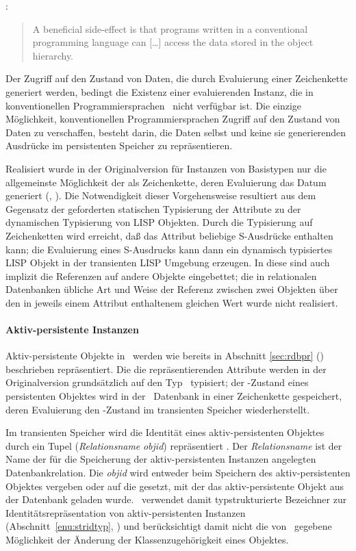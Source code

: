 \cite[]{bib:ro87}:
%
\begin{quote}
A beneficial side-effect is that programs written in a conventional
programming language can [\ldots] access the data stored in the
object hierarchy.
\end{quote}
%
Der Zugriff auf den Zustand von Daten, die durch Evaluierung einer
Zeichenkette generiert werden, bedingt die Existenz einer
evaluierenden Instanz, die in konventionellen Programmiersprachen
\ia\ nicht verf\"{u}gbar ist. Die einzige M\"{o}glichkeit,
konventionellen Programmiersprachen Zugriff auf den Zustand von Daten
zu verschaffen, besteht darin, die Daten selbst und keine sie
generierenden Ausdr\"{u}cke im persistenten Speicher zu repr\"{a}sentieren.
%
\par{}Realisiert wurde in der Originalversion f\"{u}r Instanzen von
Basistypen nur die allgemeinste M\"{o}glichkeit der \representation{} als
Zeichenkette, deren Evaluierung das Datum generiert (\handle,
\citepage{\pageref{sec:handle}}). Die Notwendigkeit dieser
Vorgehensweise resultiert aus dem Gegensatz der geforderten statischen
Typisierung der Attribute zu der dynamischen Typisierung von LISP
Objekten. Durch die Typisierung auf Zeichenketten wird erreicht,
da\ss{} das Attribut beliebige S-Ausdr\"{u}cke enthalten kann; die
Evaluierung eines S-Ausdrucks kann dann ein dynamisch typisiertes LISP
Objekt in der transienten LISP Umgebung erzeugen. In diese
\representationform{} sind auch implizit die Referenzen auf andere
Objekte eingebettet; die in relationalen Datenbanken \"{u}bliche Art und
Weise der Referenz zwischen zwei Objekten \"{u}ber den in jeweils einem
Attribut enthaltenem gleichen Wert wurde nicht realisiert.
%
\paragraph{Aktiv-persistente Instanzen}%
\label{sec:sohapi}%
%
Aktiv-persistente Objekte in \soh\ werden wie
bereits in Abschnitt \ref{sec:rdbpr} (\citepage{\pageref{sec:rdbpr}})
beschrieben repr\"{a}sentiert. Die die \Slt[s]\/ repr\"{a}sentierenden
Attribute werden in der Originalversion grunds\"{a}tzlich auf den Typ
\ typisiert; der
\Slt\/-Zustand eines persistenten Objektes wird in der
\postgres\ Datenbank in einer Zeichenkette gespeichert, deren
Evaluierung den \Slt\/-Zustand im transienten Speicher
wiederherstellt.
%
\par{}Im transienten Speicher wird die Identit\"{a}t eines
aktiv-persistenten Objektes durch ein Tupel
({\it\lt{}Relationsname\gt\/} {\it\lt{}objid\gt\/}) repr\"{a}sentiert
\cite[]{bib:ro87}. Der
{\it\lt{}Relationsname\gt\/} ist der Name der f\"{u}r die Speicherung
der aktiv-persistenten Instanzen angelegten Datenbankrelation. Die
{\it\lt{}objid\gt\/} wird entweder beim Speichern des
aktiv-persistenten Objektes vergeben oder auf die \objid\/ gesetzt,
mit der das aktiv-persistente Objekt aus der Datenbank geladen wurde.
\soh\ verwendet damit typstrukturierte Bezeichner zur
Identit\"{a}tsrepr\"{a}sentation von aktiv-persistenten Instanzen
(Abschnitt~\ref{enu:stridtyp}, \citepage{\pageref{enu:stridtyp}}) und
ber\"{u}cksichtigt damit nicht die von \clos\ gegebene M\"{o}glichkeit der
\"{A}nderung der Klassenzugeh\"{o}rigkeit eines Objektes.
%

